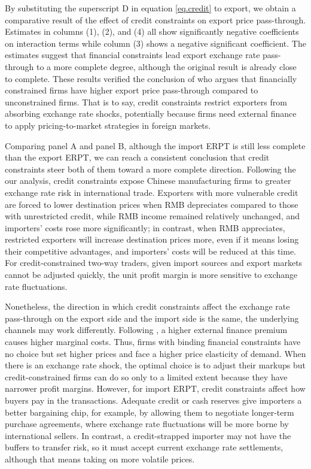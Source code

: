 \documentclass[12pt]{article}
\begin{document}
By substituting the superscript D in equation \ref{eq.credit} to export, we obtain a comparative result of the effect of credit constraints on export price pass-through. Estimates in columns (1), (2), and (4) all show significantly negative coefficients on interaction terms while column (3) shows a negative significant coefficient. The estimates suggest that financial constraints lead export exchange rate pass-through to a more complete degree, although the original result is already close to complete. These results verified the conclusion of \cite{strasser2013} who argues that financially constrained firms have higher export price pass-through compared to unconstrained firms. That is to say, credit constraints restrict exporters from absorbing exchange rate shocks, potentially because firms need external finance to apply pricing-to-market strategies in foreign markets.

Comparing panel A and panel B, although the import ERPT is still less complete than the export ERPT, we can reach a consistent conclusion that credit constraints steer both of them toward a more complete direction. Following the our analysis, credit constraints expose Chinese manufacturing firms to greater exchange rate risk in international trade. Exporters with more vulnerable credit are forced to lower destination prices when RMB depreciates compared to those with unrestricted credit, while RMB income remained relatively unchanged, and importers’ costs rose more significantly; in contrast, when RMB appreciates, restricted exporters will increase destination prices more, even if it means losing their competitive advantages, and importers' costs will be reduced at this time. For credit-constrained two-way traders, given import sources and export markets cannot be adjusted quickly, the unit profit margin is more sensitive to exchange rate fluctuations.

Nonetheless, the direction in which credit constraints affect the exchange rate pass-through on the export side and the import side is the same, the underlying channels may work differently. Following \cite{strasser2013}, a higher external finance premium causes higher marginal costs. Thus, firms with binding financial constraints have no choice but set higher prices and face a higher price elasticity of demand. When there is an exchange rate shock, the optimal choice is to adjust their markups but credit-constrained firms can do so only to a limited extent because they have narrower profit margins. However, for import ERPT, credit constraints affect how buyers pay in the transactions. Adequate credit or cash reserves give importers a better bargaining chip, for example, by allowing them to negotiate longer-term purchase agreements, where exchange rate fluctuations will be more borne by international sellers. In contrast, a credit-strapped importer may not have the buffers to transfer risk, so it must accept current exchange rate settlements, although that means taking on more volatile prices.
\end{document}
